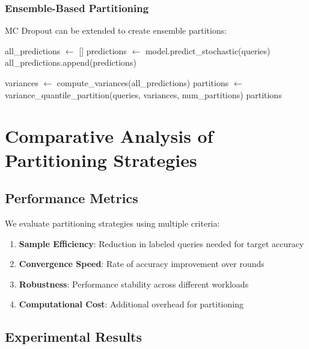 \subsubsection{Ensemble-Based Partitioning}

MC Dropout can be extended to create ensemble partitions:

\begin{algorithm}
\caption{MC Dropout Ensemble Partitioning}
\label{alg:mc_ensemble}
\begin{algorithmic}[1]
    \State all\_predictions $\gets$ []
        \State predictions $\gets$ model.predict\_stochastic(queries)
        \State all\_predictions.append(predictions)
    \EndFor
    
    \State variances $\gets$ compute\_variances(all\_predictions)
    \State partitions $\gets$ variance\_quantile\_partition(queries, variances, num\_partitions)
    \State \Return partitions
\EndProcedure
\end{algorithmic}
\end{algorithm}

\section{Comparative Analysis of Partitioning Strategies}

\subsection{Performance Metrics}

We evaluate partitioning strategies using multiple criteria:

\begin{enumerate}
    \item \textbf{Sample Efficiency}: Reduction in labeled queries needed for target accuracy
    \item \textbf{Convergence Speed}: Rate of accuracy improvement over rounds
    \item \textbf{Robustness}: Performance stability across different workloads
    \item \textbf{Computational Cost}: Additional overhead for partitioning
\end{enumerate}

\subsection{Experimental Results}

